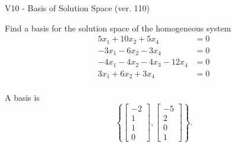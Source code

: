 \begin{exercise}
  \begin{exerciseTitle}V10 - Basis of Solution Space (ver. 110)\end{exerciseTitle}
  \begin{exerciseStatement}
    Find a basis for the solution space of the homogeneous system 
\begin{align*}
 5 x_ 1 + 10 x_ 2 + 5 x_ 4 &= 0  \\ 
  -3 x_ 1 -6 x_ 2 -3 x_ 4 &= 0  \\ 
  -4 x_ 1 -4 x_ 2 -4 x_ 3 -12 x_ 4 &= 0  \\ 
  3 x_ 1 + 6 x_ 2 + 3 x_ 4 &= 0  \\ 
 \end{align*}


 
  \end{exerciseStatement}

  \begin{exerciseAnswer}
   A basis is   
\[\left\{\left[\begin{array}{c}
-2 \\
1 \\
1 \\
0
\end{array}\right] , \left[\begin{array}{c}
-5 \\
2 \\
0 \\
1
\end{array}\right]\right\}.\]

  


  \end{exerciseAnswer}
\end{exercise}